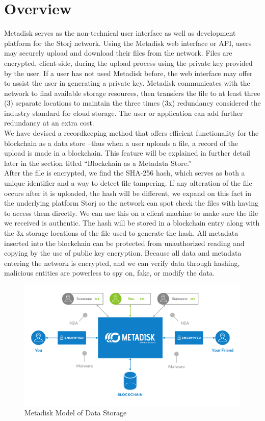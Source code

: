 \documentclass[a4paper,10pt]{article}
\begin{document}
\section{Overview}

Metadisk serves as the non-technical user interface as well as development platform for the Storj network. Using the Metadisk web interface or API, users may securely upload and download their files from the network. Files are encrypted, client-side, during the upload process using the private key provided by the user.  If a user has not used Metadisk before, the web interface may offer to assist the user in generating a private key. Metadisk communicates with the network to find available storage resources, then transfers the file to at least three (3) separate locations to maintain the three times (3x) redundancy considered the industry standard for cloud storage. The user or application can add further redundancy at an extra cost. \\

We have devised a recordkeeping method that offers efficient functionality for the blockchain as a data store --thus when a user uploads a file, a record of the upload is made in a blockchain. This feature will be explained in further detail later in the section titled “Blockchain as a Metadata Store.”\\

After the file is encrypted, we find the SHA-256 hash, which serves as both a unique identifier and a way to detect file tampering.  If any alteration of the file occurs after it is uploaded, the hash will be different, we expand on this fact in the underlying platform Storj \cite{7} so the network can spot check the files with having to access them directly. We can use this on a client machine to make sure the file we received is authentic. The hash will be stored in a blockchain entry along with the 3x storage locations of the file used to generate the hash.  All metadata inserted into the blockchain can be protected from unauthorized reading and copying by the use of public key encryption.  Because all data and metadata entering the network is encrypted, and we can verify data through hashing, malicious entities are powerless to spy on, fake, or modify the data.

\begin{figure}[h!]
  \centering
      \includegraphics[width=\linewidth]{02}
  \caption{Metadisk Model of Data Storage}
\end{figure}
\end{document}
